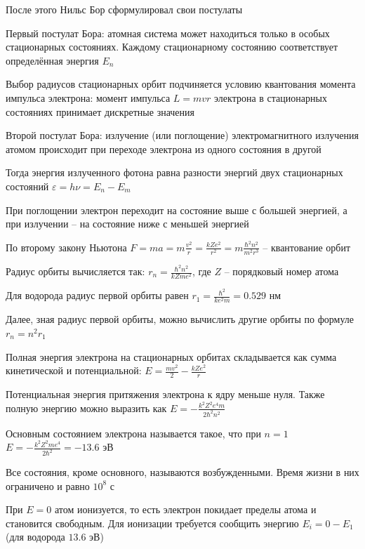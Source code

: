 \documentclass[12pt]{article}
\begin{document}
После этого Нильс Бор сформулировал свои постулаты

Первый постулат Бора: атомная система может находиться только в особых стационарных состояниях. Каждому стационарному состоянию соответствует определённая энергия $E_n$

Выбор радиусов стационарных орбит подчиняется условию квантования момента импульса электрона: момент импульса $L = m v r$ электрона в стационарных состояниях принимает дискретные значения

Второй постулат Бора: излучение (или поглощение) электромагнитного излучения атомом происходит при переходе электрона из одного состояния в другой

Тогда энергия излученного фотона равна разности энергий двух стационарных состояний $\varepsilon = h \nu = E_n - E_m$

При поглощении электрон переходит на состояние выше с большей энергией, а при излучении -- на состояние ниже с меньшей энергией

По второму закону Ньютона $F = m a = m \frac{v^2}{r} = \frac{k Z e^2}{r^2} = m \frac{\hbar^2 n^2}{m^2 r^3}$ -- квантование орбит 

Радиус орбиты вычисляется так: $r_n = \frac{\hbar^2 n^2}{k Z m e^2}$, где $Z$ -- порядковый номер атома

Для водорода радиус первой орбиты равен $r_1 = \frac{\hbar^2}{k e^2 m} = 0.529$ нм

Далее, зная радиус первой орбиты, можно вычислить другие орбиты по формуле $r_n = n^2 r_1$


\smallvspace

Полная энергия электрона на стационарных орбитах складывается как сумма кинетической и потенциальной: $E = \frac{m v^2}{2} - \frac{k Z e^2}{r}$

Потенциальная энергия притяжения электрона к ядру меньше нуля. Также полную энергию можно выразить как $E = -\frac{k^2 Z^2 e^4 m}{2 \hbar^2 n^2}$

Основным состоянием электрона называется такое, что при $n = 1$ $E = -\frac{k^2 Z^2 m e^4}{2\hbar^2} = -13.6$ эВ 

Все состояния, кроме основного, называются возбужденными. Время жизни в них ограничено и равно $10^8$ с

При $E = 0$ атом ионизуется, то есть электрон покидает пределы атома и становится свободным. Для ионизации требуется сообщить энергию $E_i = 0 - E_1$ (для водорода $13.6$ эВ)
\end{document}
